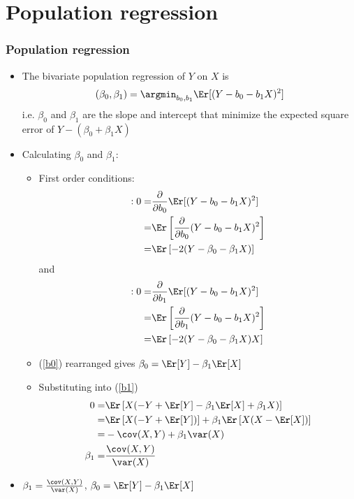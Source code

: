 \section{Population regression} 
\begin{frame}[allowframebreaks]\frametitle{Population regression}
  \begin{itemize}
  \item The bivariate \alert{population regression} of $Y$ on $X$ is 
    \[ (\beta_0, \beta_1) = \argmin_{b_0,b_1} \Er[(Y - b_0 - b_1
    X)^2 ] \] 
    i.e. $\beta_0$ and $\beta_1$ are the slope and intercept that
    minimize the expected square error of $Y - (\beta_0 + \beta_1 X)$ 
  \item Calculating $\beta_0$ and $\beta_1$:
    \begin{itemize}
    \item First order conditions:
      \begin{align}
        [b_0]: 0 = & \frac{\partial}{\partial b_0} \Er[(Y - b_0 - b_1
        X)^2 ] \notag \\
         = & \Er\left[\frac{\partial}{\partial b_0}  (Y - b_0 - b_1 X)^2 \right]
         \notag \\
        = & \Er\left[ -2(Y - \beta_0 - \beta_1 X) \right] \label{b0}
      \end{align}
      and
      \begin{align}
        [b_1]:  0 = & \frac{\partial}{\partial b_1} \Er[(Y - b_0 - b_1
        X)^2 ] \notag \\
         = & \Er\left[\frac{\partial}{\partial b_1}  (Y - b_0 - b_1 X)^2 \right]
        \notag \\
        = & \Er\left[ -2(Y - \beta_0 - \beta_1 X)X \right] \label{b1}
      \end{align}
    \item (\ref{b0}) rearranged gives $\beta_0 = \Er[Y] - \beta_1
      \Er[X]$
    \item Substituting into (\ref{b1})
      \begin{align*}
        0 = & \Er\left[ X(-Y + \Er[Y] - \beta_1 \Er[X] + \beta_1 X) \right] \\
        = & \Er\left[X(-Y + \Er[Y])\right] + \beta_1\Er\left[X(X -
          \Er[X])\right] \\
        = & -\cov(X,Y) + \beta_1 \var(X) \\
        \beta_1 = & \frac{\cov(X,Y)}{\var(X)}
      \end{align*}
    \end{itemize}
  \item \alert{$\beta_1 = \frac{\cov(X,Y)}{\var(X)}$, $\beta_0 = \Er[Y] - \beta_1
      \Er[X]$}
  \end{itemize}
\end{frame}

